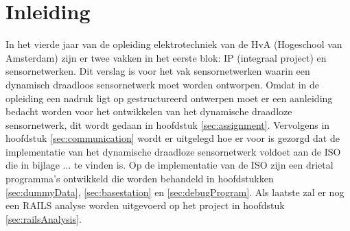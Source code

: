 \section{Inleiding}

In het vierde jaar van de opleiding elektrotechniek van de HvA (Hogeschool van Amsterdam) zijn er twee vakken in het eerste blok: IP (integraal project) en sensornetwerken. Dit verslag is voor het vak sensornetwerken waarin een dynamisch draadloos sensornetwerk moet worden ontworpen. Omdat in de opleiding een nadruk ligt op gestructureerd ontwerpen moet er een aanleiding bedacht worden voor het ontwikkelen van het dynamische draadloze sensornetwerk, dit wordt gedaan in hoofdstuk \ref{sec:assignment}. Vervolgens in hoofdstuk \ref{sec:communication} wordt er uitgelegd hoe er voor is gezorgd dat de implementatie van het dynamische draadloze sensornetwerk voldoet aan de ISO die in bijlage ... te vinden is. Op de implementatie van de ISO zijn een drietal programma's ontwikkeld die worden behandeld in hoofdstukken \ref{sec:dummyData}, \ref{sec:basestation} en \ref{sec:debugProgram}. Als laatste zal er nog een RAILS analyse worden uitgevoerd op het project in hoofdstuk \ref{sec:railsAnalysis}.